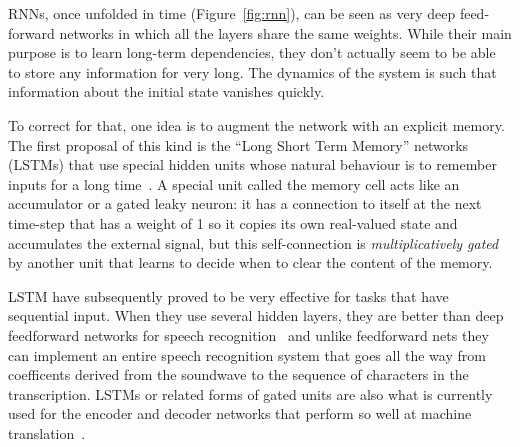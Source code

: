 \documentclass[10pts]{article}
\begin{document}

RNNs, once unfolded in time (Figure~\ref{fig:rnn}), can be seen as very deep
feed-forward networks in which all the layers share the same weights.
While their main purpose is to learn long-term dependencies, they
don't actually seem to be able to store any information for very
long. The dynamics of the system is such that information about the
initial state vanishes quickly. 

To correct for that, one idea is to augment the network with an
explicit memory. The first proposal of this kind is the ``Long Short
Term Memory'' networks (LSTMs) that use special hidden units whose
natural behaviour is to remember inputs for a long
time~\citep{Hochreiter+Schmidhuber-1997}.  
A special unit called the memory cell
acts like an accumulator or a gated leaky neuron: it has a connection
to itself at the next time-step that has a weight of 1 so it copies
its own real-valued state and accumulates the external signal, but
this self-connection is {\em multiplicatively gated} by another unit
that learns to decide when to clear the content of the memory.

LSTM have subsequently proved
to be very effective for tasks that have sequential input.  When they
use several hidden layers, they are better than deep feedforward
networks for speech recognition~\citep{Graves-et-al-ICASSP2013} and
unlike feedforward nets they can implement an entire speech
recognition system that goes all the way from coefficents derived from
the soundwave to the sequence of characters in the transcription.
LSTMs or related forms of gated units are also what is currently used
for the encoder and decoder networks that perform so well at machine
translation~\citep{Bahdanau-et-al-ICLR2015,Sutskever-et-al-NIPS2014}.
\end{document}
